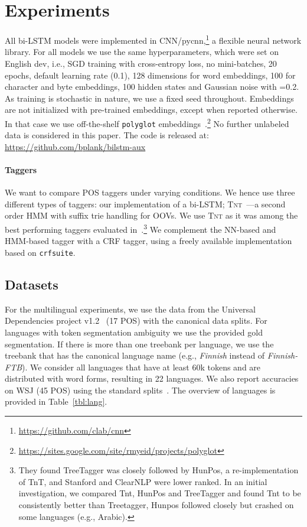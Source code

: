 \documentclass[11pt]{article}
\begin{document}
 
\section{Experiments} 
All bi-LSTM models were implemented in CNN/pycnn,\footnote{\url{https://github.com/clab/cnn}} a flexible neural network library. For all models we use the same hyperparameters, which were set on English dev, i.e., SGD training with cross-entropy loss, no mini-batches, 20 epochs, default learning rate (0.1), 128 dimensions for word embeddings, 100 for character and byte embeddings, 100 hidden states and Gaussian noise with =0.2. As training is stochastic in nature, we use a fixed seed throughout. Embeddings are not initialized with pre-trained embeddings, except when reported otherwise. In that case we use off-the-shelf \texttt{polyglot} embeddings~\cite{polyglot:2013}.\footnote{\url{https://sites.google.com/site/rmyeid/projects/polyglot}} No further unlabeled data is considered in this paper. The code is released at: \url{https://github.com/bplank/bilstm-aux} 

\paragraph{Taggers} We want to compare POS taggers under varying conditions. We hence use three different types of taggers: our implementation of a bi-LSTM; \textsc{Tnt}~\cite{brants2000tnt}---a second order HMM with suffix trie handling for OOVs. We use \textsc{Tnt} as it was among the best performing taggers evaluated in~.\footnote{They found TreeTagger was closely followed by HunPos, a re-implementation of TnT, and Stanford  and ClearNLP were lower ranked. In an initial investigation, we compared Tnt, HunPos and TreeTagger and found Tnt to be consistently better than Treetagger, Hunpos followed closely but crashed on some languages (e.g., Arabic).} We complement the NN-based and HMM-based tagger with a CRF tagger, using a freely available implementation~\cite{Plank:ea:14:coling} based on \texttt{crfsuite}. 

\subsection{Datasets}

For the multilingual experiments, we use the data from the Universal Dependencies project v1.2~\cite{universal1.2} (17 POS) with the canonical data splits. 
For languages with token segmentation ambiguity we use the provided gold segmentation. If there is more than one treebank per language, we use the treebank that has the canonical language name (e.g.,  \emph{Finnish} instead of \emph{Finnish-FTB}). 
We consider all languages that have at least 60k tokens and are distributed with word forms, resulting in 22 languages. 
We also report accuracies on WSJ (45 POS) using the standard splits~\cite{Collins:02,Manning:11}. The overview of languages is provided in Table~\ref{tbl:lang}.
\end{document}
